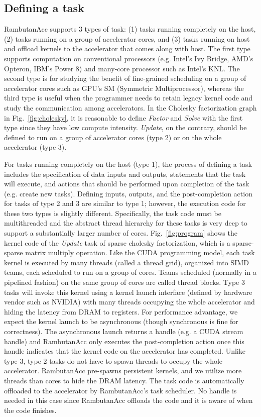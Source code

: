 \subsection{Defining a task}
RambutanAcc supports 3 types of task: (1) tasks running completely on the host, (2) tasks running on a group of accelerator cores, and (3) tasks running on host and offload kernels to the accelerator that comes along with host.
The first type supports computation on conventional processors (e.g. Intel's Ivy Bridge, AMD's Opteron, IBM's Power 8)  and many-core processor such as Intel's KNL.
The second type is for studying the benefit of fine-grained scheduling on a group of accelerator cores such as GPU's SM (Symmetric Multiprocessor), whereas the third type is useful when the programmer needs to retain legacy kernel code and study the communication among accelerators.
In the Cholesky factorization graph in Fig.~\ref{fig:cholesky}, it is reasonable to define {\em Factor} and {\em Solve} with the first type since they have low compute intensity. 
{\em Update}, on the contrary, should be defined to run on a group of accelerator cores (type 2) or on the whole accelerator (type 3).

For tasks running completely on the host (type 1), the process of defining a task includes the specification of data inputs and outputs, statements that the task will execute, and actions that should be performed upon completion of the task (e.g. create new tasks).
Defining inputs, outputs, and the post-completion action for tasks of type 2 and 3 are similar to type 1; however, the execution code for these two types is slightly different.
Specifically, the task code must be multithreaded and the abstract thread hierarchy for these tasks is very deep to support a substantially larger number of cores.
Fig.~\ref{fig:program} shows the kernel code of the {\em Update} task of sparse cholesky factorization, which is a sparse-sparse matrix multiply operation.
Like the CUDA programming model, each task kernel is executed by many threads (called a thread grid), organized into SIMD teams, each scheduled to run on a group of cores.
Teams scheduled (normally in a pipelined fashion) on the same group of cores are called thread blocks.
Type 3 tasks will invoke this kernel using a kernel launch interface (defined by hardware vendor such as NVIDIA) with many threads occupying the whole accelerator and hiding the latency from DRAM to registers.
For performance advantage, we expect the kernel launch to be asynchronous (though synchronous is fine for correctness).
The asynchronous launch returns a handle (e.g. a CUDA stream handle) and RambutanAcc only executes the post-completion action once this handle indicates that the kernel code on the accelerator has completed.
Unlike type 3, type 2 tasks do not have to spawn threads to occupy the whole accelerator.
RambutanAcc pre-spawns persistent kernels, and we utilize more threads than cores to hide the DRAM latency.
The task code is automatically offloaded to the accelerator by RambutanAcc's task scheduler.
No handle is needed in this case since RambutanAcc offloads the code and it is aware of when the code finishes.


